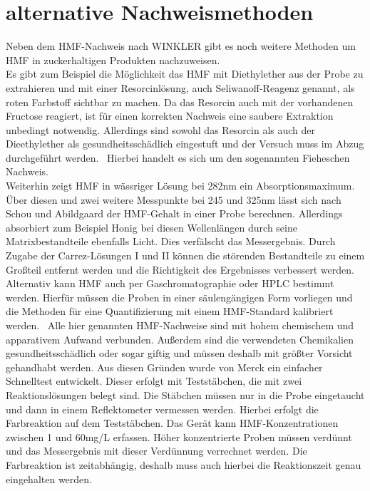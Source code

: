 \section{alternative Nachweismethoden}

Neben dem HMF-Nachweis nach WINKLER gibt es noch weitere Methoden um HMF in zuckerhaltigen Produkten nachzuweisen.\\
Es gibt zum Beispiel die Möglichkeit das HMF mit Diethylether aus der Probe zu extrahieren und mit einer Resorcinlösung, auch Seliwanoff-Reagenz genannt, als roten Farbstoff sichtbar zu machen. Da das Resorcin auch mit der vorhandenen Fructose reagiert, ist für einen korrekten Nachweis eine saubere Extraktion unbedingt notwendig. Allerdings sind sowohl das Resorcin als auch der Dieethylether als gesundheitsschädlich eingestuft und der Versuch muss im Abzug durchgeführt werden.~\cite{Resorcinnachweis} Hierbei handelt es sich um den sogenannten Fieheschen Nachweis.~\cite{Winkler}\\
Weiterhin zeigt HMF in wässriger Lösung bei 282nm ein Absorptionsmaximum. Über diesen und zwei weitere Messpunkte bei 245 und 325nm lässt sich nach Schou und Abildgaard der HMF-Gehalt in einer Probe berechnen. Allerdings absorbiert zum Beispiel Honig bei diesen Wellenlängen durch seine Matrixbestandteile ebenfalls Licht. Dies verfälscht das Messergebnis. Durch Zugabe der Carrez-Lösungen I und II können die störenden Bestandteile zu einem Großteil entfernt werden und die Richtigkeit des Ergebnisses verbessert werden.~\cite{Winkler}
Alternativ kann HMF auch per Gaschromatographie oder HPLC bestimmt werden. Hierfür müssen die Proben in einer säulengängigen Form vorliegen und die Methoden für eine Quantifizierung mit einem HMF-Standard kalibriert werden.~\cite{Patent}
Alle hier genannten HMF-Nachweise sind mit hohem chemischem und apparativem Aufwand verbunden. Außerdem sind die verwendeten Chemikalien gesundheitsschädlich oder sogar giftig und müssen deshalb mit größter Vorsicht gehandhabt werden. Aus diesen Gründen wurde von Merck ein einfacher Schnelltest entwickelt. Dieser erfolgt mit Teststäbchen, die mit zwei Reaktionslösungen belegt sind. Die Stäbchen müssen nur in die Probe eingetaucht und dann in einem Reflektometer vermessen werden. Hierbei erfolgt die Farbreaktion auf dem Teststäbchen. Das Gerät kann HMF-Konzentrationen zwischen 1 und 60mg/L erfassen. Höher konzentrierte Proben müssen verdünnt und das Messergebnis mit dieser Verdünnung verrechnet werden. Die Farbreaktion ist zeitabhängig, deshalb muss auch hierbei die Reaktionszeit genau eingehalten werden.~\cite{Merck}

